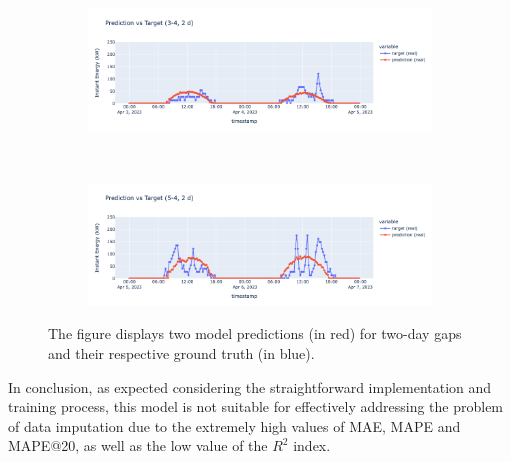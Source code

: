 \begin{figure}[H]
	\centering
	\begin{subfigure}{\textwidth}
		\centering
		\includegraphics[width=\textwidth]{chapters/3_models/imgs/ufnc/eval/ufcpred3-4.png}
		\caption{}
	\end{subfigure}\\
	\begin{subfigure}{\textwidth}
		\centering
		\includegraphics[width=\textwidth]{chapters/3_models/imgs/ufnc/eval/ufcpred5-4.png}
		\caption{}
	\end{subfigure}
	\caption{The figure displays two model predictions (in red) for two-day gaps and their respective ground truth (in blue).} %
	\label{fig:ufcnevalbrutti}
\end{figure}

In conclusion, as expected considering the straightforward implementation and training process, this model is not suitable for effectively addressing the problem of data imputation due to the extremely high values of MAE, MAPE and MAPE@20, as well as the low value of the $R^2$ index.

